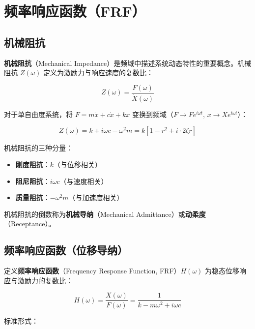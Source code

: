 \section{频率响应函数（FRF）}

\subsection{机械阻抗}

\textbf{机械阻抗}（Mechanical Impedance）是频域中描述系统动态特性的重要概念。机械阻抗 $Z(\omega)$ 定义为激励力与响应速度的复数比：
\begin{myformula}
    \[
    Z(\omega) = \frac{F(\omega)}{\dot{X}(\omega)}
    \]
\end{myformula}

对于单自由度系统，将 $F = m\ddot{x} + c\dot{x} + kx$ 变换到频域（$F \to F e^{i\omega t}$, $x \to X e^{i\omega t}$）：
\begin{myformula}
    \[
    Z(\omega) = k + i\omega c - \omega^2 m
              = k\left[1 - r^2 + i\cdot 2\zeta r\right]
    \]
\end{myformula}

机械阻抗的三种分量：
\begin{itemize}
    \item \textbf{刚度阻抗}：$k$（与位移相关）
    \item \textbf{阻尼阻抗}：$i\omega c$（与速度相关）
    \item \textbf{质量阻抗}：$-\omega^2 m$（与加速度相关）
\end{itemize}

机械阻抗的倒数称为\textbf{机械导纳}（Mechanical Admittance）或\textbf{动柔度}（Receptance）。

\subsection{频率响应函数（位移导纳）}

定义\textbf{频率响应函数}（Frequency Response Function, FRF）$H(\omega)$ 为稳态位移响应与激励力的复数比：
\begin{myformula}
    \[
    H(\omega) = \frac{X(\omega)}{F(\omega)} = \frac{1}{k - m\omega^2 + i\omega c}
    \]
\end{myformula}

标准形式：
\begin{myformula}
    \end{myformula}

